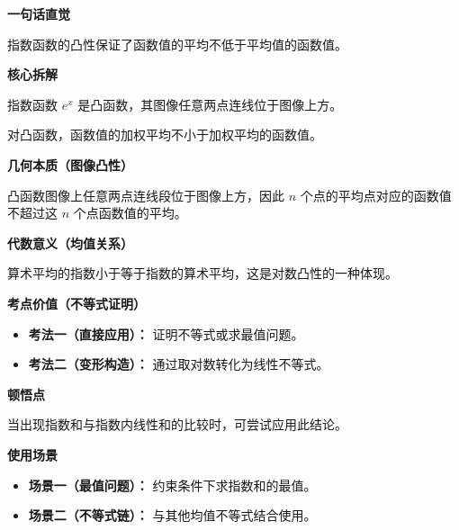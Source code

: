 \begin{explanationbox}
\textbf{\textcolor{CExplanation}{一句话直觉}}

指数函数的凸性保证了函数值的平均不低于平均值的函数值。

\medskip
\textbf{\textcolor{CExplanation}{核心拆解}}
\begin{description}[style=nextline, leftmargin=2.8em, labelsep=0.5em, itemsep=0.45em]
    \item[\textbf{要点一（凸函数性质）：}] 指数函数 $e^x$ 是凸函数，其图像任意两点连线位于图像上方。
    \item[\textbf{要点二（Jensen不等式）：}] 对凸函数，函数值的加权平均不小于加权平均的函数值。
\end{description}

\medskip
\textbf{\textcolor{CExplanation}{几何本质（图像凸性）}}

凸函数图像上任意两点连线段位于图像上方，因此 $n$ 个点的平均点对应的函数值不超过这 $n$ 个点函数值的平均。

\medskip
\textbf{\textcolor{CExplanation}{代数意义（均值关系）}}

算术平均的指数小于等于指数的算术平均，这是对数凸性的一种体现。

\medskip
\textbf{\textcolor{CExplanation}{考点价值（不等式证明）}}
\begin{itemize}[leftmargin=*, itemsep=0.5em, topsep=0.4em]
    \item \textbf{考法一（直接应用）：} 证明不等式或求最值问题。
    \item \textbf{考法二（变形构造）：} 通过取对数转化为线性不等式。
\end{itemize}

\medskip
\textbf{\textcolor{CExplanation}{顿悟点}}

当出现指数和与指数内线性和的比较时，可尝试应用此结论。

\medskip
\textbf{\textcolor{CExplanation}{使用场景}}
\begin{itemize}[leftmargin=*, itemsep=0.5em, topsep=0.4em]
    \item \textbf{场景一（最值问题）：} 约束条件下求指数和的最值。
    \item \textbf{场景二（不等式链）：} 与其他均值不等式结合使用。
\end{itemize}
\end{explanationbox}
